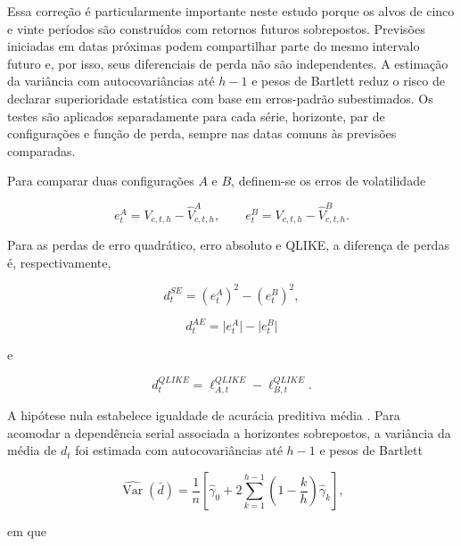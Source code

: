 \documentclass[a4paper,fleqn]{cas-sc}
\begin{document}
Essa correção é particularmente importante neste estudo porque os alvos de cinco e vinte períodos são construídos com retornos futuros sobrepostos. Previsões iniciadas em datas próximas podem compartilhar parte do mesmo intervalo futuro e, por isso, seus diferenciais de perda não são independentes. A estimação da variância com autocovariâncias até \(h-1\) e pesos de Bartlett reduz o risco de declarar superioridade estatística com base em erros-padrão subestimados. Os testes são aplicados separadamente para cada série, horizonte, par de configurações e função de perda, sempre nas datas comuns às previsões comparadas.

Para comparar duas configurações \(A\) e \(B\), definem-se os erros de volatilidade

\begin{equation}
e^{A}_{t}=V_{c,t,h}-\widehat{V}^{A}_{c,t,h},
\qquad
e^{B}_{t}=V_{c,t,h}-\widehat{V}^{B}_{c,t,h}.
\label{eq:forecast_errors}
\end{equation}

Para as perdas de erro quadrático, erro absoluto e QLIKE, a diferença de perdas é, respectivamente,

\begin{equation}
d_t^{SE}=(e^{A}_{t})^{2}-(e^{B}_{t})^{2},
\label{eq:dm_se}
\end{equation}

\begin{equation}
d_t^{AE}=\lvert e^{A}_{t}\rvert-\lvert e^{B}_{t}\rvert
\label{eq:dm_ae}
\end{equation}

e

\begin{equation}
d_t^{QLIKE}
=
\ell^{QLIKE}_{A,t}-\ell^{QLIKE}_{B,t}.
\label{eq:dm_qlike}
\end{equation}

A hipótese nula estabelece igualdade de acurácia preditiva média \citep{DieboldMariano1995,HarveyLeybourneNewbold1997}. Para acomodar a dependência serial associada a horizontes sobrepostos, a variância da média de \(d_t\) foi estimada com autocovariâncias até \(h-1\) e pesos de Bartlett

\begin{equation}
\widehat{\operatorname{Var}}(\bar d)
=
\frac{1}{n}
\left[
\widehat{\gamma}_{0}
+2\sum_{k=1}^{h-1}
\left(1-\frac{k}{h}\right)\widehat{\gamma}_{k}
\right],
\label{eq:dm_variance}
\end{equation}

em que
\end{document}
